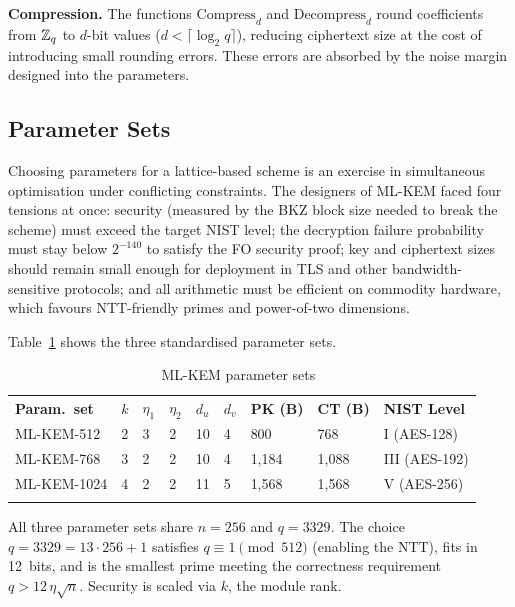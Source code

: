 \noindent\textbf{Compression.} The functions $\mathrm{Compress}_d$ and $\mathrm{Decompress}_d$ round coefficients from $\mathbb{Z}_q$ to $d$-bit values ($d < \lceil \log_2 q \rceil$), reducing ciphertext size at the cost of introducing small rounding errors.  These errors are absorbed by the noise margin designed into the parameters.


\subsection{Parameter Sets}
\label{subsec:mlkem-params}

Choosing parameters for a lattice-based scheme is an exercise in simultaneous optimisation under conflicting constraints.  The designers of ML-KEM faced four tensions at once: security (measured by the BKZ block size needed to break the scheme) must exceed the target NIST level; the decryption failure probability must stay below $2^{-140}$ to satisfy the FO security proof; key and ciphertext sizes should remain small enough for deployment in TLS and other bandwidth-sensitive protocols; and all arithmetic must be efficient on commodity hardware, which favours NTT-friendly primes and power-of-two dimensions.

Table~\ref{tab:mlkem-params} shows the three standardised parameter sets.

\begin{table}[t]
\caption{ML-KEM parameter sets~\cite{FIPS203}}
\label{tab:mlkem-params}
\begin{tabular}{p{2.5cm}p{0.5cm}p{0.5cm}p{0.5cm}p{0.8cm}p{0.8cm}p{1.2cm}p{1.2cm}p{1.8cm}}
\hline\noalign{\smallskip}
\textbf{Param.\ set} & $k$ & $\eta_1$ & $\eta_2$ & $d_u$ & $d_v$ & \textbf{PK (B)} & \textbf{CT (B)} & \textbf{NIST Level} \\
\noalign{\smallskip}\svhline\noalign{\smallskip}
ML-KEM-512   & 2 & 3 & 2 & 10 & 4  & 800   & 768   & I (AES-128) \\
ML-KEM-768   & 3 & 2 & 2 & 10 & 4  & 1,184 & 1,088 & III (AES-192) \\
ML-KEM-1024  & 4 & 2 & 2 & 11 & 5  & 1,568 & 1,568 & V (AES-256) \\
\noalign{\smallskip}\hline
\end{tabular}
\end{table}

All three parameter sets share $n = 256$ and $q = 3329$.  The choice $q = 3329 = 13\cdot 256 + 1$ satisfies $q \equiv 1 \pmod{512}$ (enabling the NTT), fits in 12~bits, and is the smallest prime meeting the correctness requirement $q > 12\,\eta\sqrt{n}$.  Security is scaled via $k$, the module rank.

